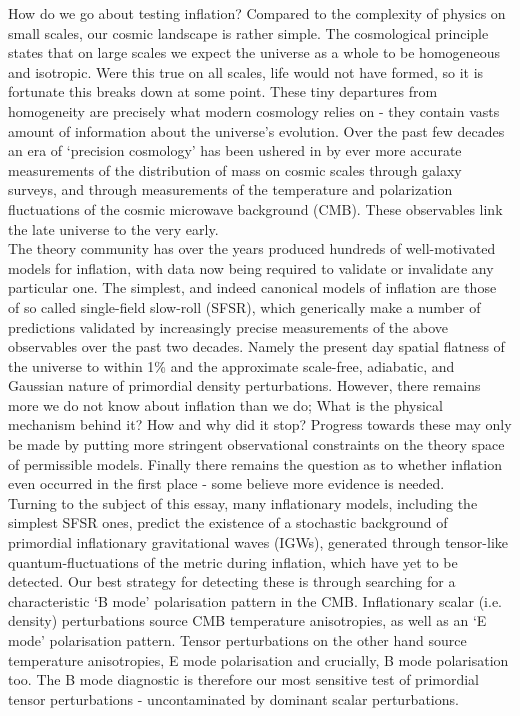 \documentclass[a4paper,10pt]{article}
\begin{document}
How do we go about testing inflation? Compared to the complexity of physics on small scales, our cosmic landscape is rather simple. The cosmological principle states that on large scales we expect the universe as a whole to be homogeneous and isotropic. Were this true on all scales, life would not have formed, so it is fortunate this breaks down at some point. These tiny departures from homogeneity are precisely what modern cosmology relies on - they contain vasts amount of information about the universe's evolution. Over the past few decades an era of `precision cosmology' has been ushered in by ever more accurate measurements of the distribution of mass on cosmic scales through galaxy surveys, and through measurements of the temperature and polarization fluctuations of the cosmic microwave background (CMB). These observables link the late universe to the very early. \\

The theory community has over the years produced hundreds of well-motivated models for inflation, with data now being required to validate or invalidate any particular one. The simplest, and indeed canonical models of inflation are those of so called single-field slow-roll (SFSR), which generically make a number of predictions validated by increasingly precise measurements of the above observables over the past two decades. Namely the present day spatial flatness of the universe to within 1\% and the approximate scale-free, adiabatic, and Gaussian nature of primordial density perturbations. However, there remains more we do not know about inflation than we do; What is the physical mechanism behind it? How and why did it stop? Progress towards these may only be made by putting more stringent observational constraints on the theory space of permissible models. Finally there remains the question as to whether inflation even occurred in the first place - some believe more evidence is needed.\\

Turning to the subject of this essay, many inflationary models, including the simplest SFSR ones, predict the existence of a stochastic background of primordial inflationary gravitational waves (IGWs), generated through tensor-like quantum-fluctuations of the metric during inflation, which have yet to be detected. Our best strategy for detecting these is through searching for a characteristic `B mode' polarisation pattern in the CMB. Inflationary scalar (i.e. density) perturbations source CMB temperature anisotropies, as well as an `E mode' polarisation pattern. Tensor perturbations on the other hand source temperature anisotropies, E mode polarisation and crucially, B mode polarisation too. The B mode diagnostic is therefore our most sensitive test of primordial tensor perturbations - uncontaminated by dominant scalar perturbations.\\
\end{document}
